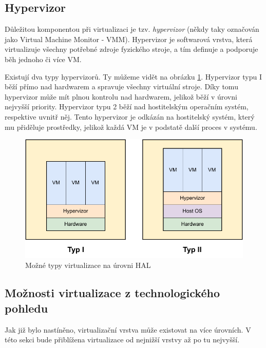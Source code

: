 \subsection{Hypervizor}

Důležitou komponentou při virtualizaci je tzv. \textit{hypervizor} (někdy taky označován jako Virtual Machine Monitor - VMM). Hypervizor je softwarová vrstva, která virtualizuje všechny potřebné zdroje fyzického stroje, a tím definuje a podporuje běh jednoho či více VM. \cite{whitaker2002denali}

Existují dva typy hypervizorů. Ty můžeme vidět na obrázku \ref{fig:vm_types}. Hypervizor typu I běží přímo nad hardwarem a spravuje všechny virtuální stroje. Díky tomu hypervizor může mít plnou kontrolu nad hardwarem, jelikož běží v úrovni nejvyšší priority. Hypervizor typu 2 běží nad hostitelským operačním systém, respektive uvnitř něj. Tento hypervizor je odkázán na hostitelský systém, který mu přiděluje prostředky, jelikož každá VM je v podstatě další proces v systému.\cite{chiueh2005survey}\cite{RODRIGUEZHARO2012267}

\begin{figure}[htbp]
    \centering 
    \includegraphics[width=\textwidth]{assets/img/vm_types.pdf}
    \caption{Možné typy virtualizace na úrovni HAL}
    \label{fig:vm_types}
\end{figure}

\subsection{Možnosti virtualizace z technologického pohledu}

Jak již bylo nastíněno, virtualizační vrstva může existovat na více úrovních. V této sekci bude přiblížena virtualizace od nejnižší vrstvy až po tu nejvyšší.

